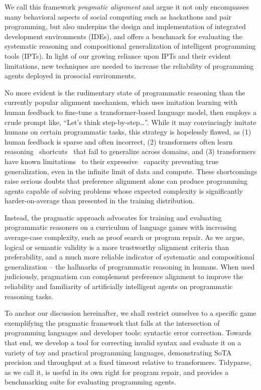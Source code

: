\documentclass[sigplan,screen]{acmart}
\begin{document}
We call this framework \emph{pragmatic alignment} and argue it not only encompasses many behavioral aspects of social computing such as hackathons and pair programming, but also underpins the design and implementation of integrated development environments (IDEs), and offers a benchmark for evaluating the systematic reasoning and compositional generalization of intelligent programming tools (IPTs). In light of our growing reliance upon IPTs and their evident limitations, new techniques are needed to increase the reliability of programming agents deployed in prosocial environments.

No more evident is the rudimentary state of programmatic reasoning than the currently popular alignment mechanism, which uses imitation learning with human feedback to fine-tune a transformer-based language model, then employs a crude prompt like, ``Let's think step-by-step\ldots''. While it may convincingly imitate humans on certain programmatic tasks, this strategy is hopelessly flawed, as (1) human feedback is sparse and often incorrect, (2) transformers often learn reasoning~\cite{dziri2023faith} shortcuts~\cite{liu2022transformers} that fail to generalize across domains, and (3) transformers have known limitations~\cite{merrill2022saturated} to their expressive~\cite{chiang2023tighter} capacity preventing true generalization, even in the infinite limit of data and compute. These shortcomings raise serious doubts that preference alignment alone can produce programming agents capable of solving problems whose expected complexity is significantly harder-on-average than presented in the training distribution.

Instead, the pragmatic approach advocates for training and evaluating programmatic reasoners on a curriculum of language games with increasing average-case complexity, such as proof search or program repair. As we argue, logical or semantic validity is a more trustworthy alignment criteria than preferability, and a much more reliable indicator of systematic and compositional generalization -- the hallmarks of programmatic reasoning in humans. When used judiciously, pragmatism can complement preference alignment to improve the reliability and familiarity of artificially intelligent agents on programmatic reasoning tasks.

To anchor our discussion hereinafter, we shall restrict ourselves to a specific game exemplifying the pragmatic framework that falls at the intersection of programming languages and developer tools: syntactic error correction. Towards that end, we develop a tool for correcting invalid syntax and evaluate it on a variety of toy and practical programming languages, demonstrating SoTA precision and throughput at a fixed timeout relative to transformers. Tidyparse, as we call it, is useful in its own right for program repair, and provides a benchmarking suite for evaluating programming agents.
\end{document}
